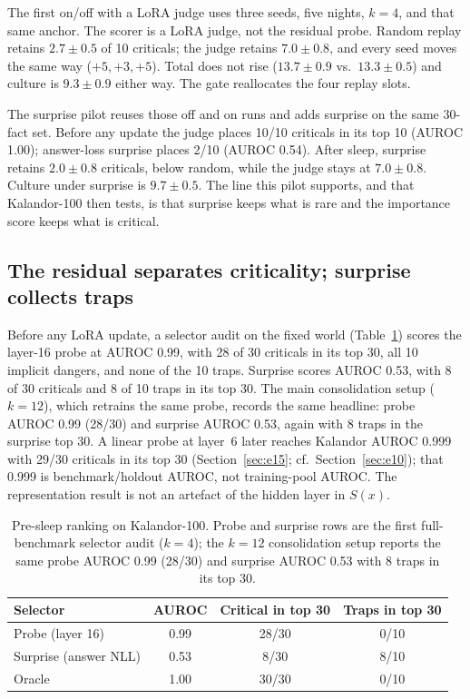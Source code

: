 \documentclass[11pt,a4paper]{article}
\begin{document}
The first on/off with a LoRA judge uses three seeds, five nights, $k{=}4$, and that same anchor.
The scorer is a LoRA judge, not the residual probe.
Random replay retains $2.7{\pm}0.5$ of 10 criticals; the judge retains $7.0{\pm}0.8$, and every seed moves the same way ($+5,+3,+5$).
Total does not rise ($13.7{\pm}0.9$ vs.\ $13.3{\pm}0.5$) and culture is $9.3{\pm}0.9$ either way.
The gate reallocates the four replay slots.

The surprise pilot reuses those off and on runs and adds surprise on the same 30-fact set.
Before any update the judge places 10/10 criticals in its top 10 (AUROC 1.00); answer-loss surprise places 2/10 (AUROC 0.54).
After sleep, surprise retains $2.0{\pm}0.8$ criticals, below random, while the judge stays at $7.0{\pm}0.8$.
Culture under surprise is $9.7{\pm}0.5$.
The line this pilot supports, and that Kalandor-100 then tests, is that surprise keeps what is rare and the importance score keeps what is critical.

\subsection{The residual separates criticality; surprise collects traps}
\label{sec:selector}

Before any LoRA update, a selector audit on the fixed world (Table~\ref{tab:selector}) scores the layer-16 probe at AUROC 0.99, with 28 of 30 criticals in its top 30, all 10 implicit dangers, and none of the 10 traps.
Surprise scores AUROC 0.53, with 8 of 30 criticals and 8 of 10 traps in its top 30.
The main consolidation setup ($k{=}12$), which retrains the same probe, records the same headline: probe AUROC 0.99 (28/30) and surprise AUROC 0.53, again with 8 traps in the surprise top 30.
A linear probe at layer~6 later reaches Kalandor AUROC 0.999 with 29/30 criticals in its top 30 (Section~\ref{sec:e15}; cf.\ Section~\ref{sec:e10}); that 0.999 is benchmark/holdout AUROC, not training-pool AUROC.
The representation result is not an artefact of the hidden layer in $S(x)$.

\begin{table}[t]
\centering
\caption{Pre-sleep ranking on Kalandor-100. Probe and surprise rows are the first full-benchmark selector audit ($k{=}4$); the $k{=}12$ consolidation setup reports the same probe AUROC 0.99 (28/30) and surprise AUROC 0.53 with 8 traps in its top 30.}
\label{tab:selector}
\small
\begin{tabular}{lccc}
\toprule
Selector & AUROC & Critical in top 30 & Traps in top 30 \\
\midrule
Probe (layer 16) & 0.99 & 28/30 & 0/10 \\
Surprise (answer NLL) & 0.53 & 8/30 & 8/10 \\
Oracle & 1.00 & 30/30 & 0/10 \\
\bottomrule
\end{tabular}
\end{table}
\end{document}
